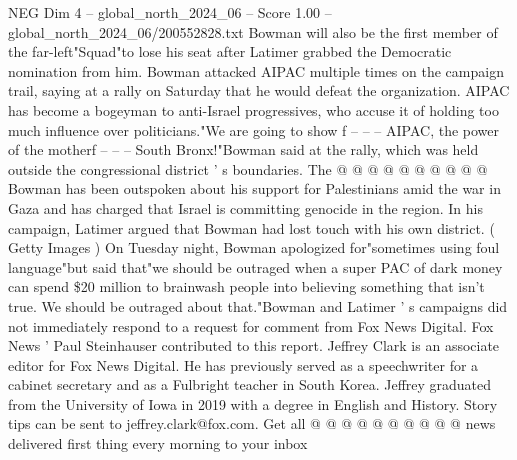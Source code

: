 \begin{textsample}{NEG Dim 4 – global\_north\_2024\_06 – Score 1.00 – global\_north\_2024\_06/200552828.txt}
Bowman will also be the first member of the far-left"Squad"to lose his seat after Latimer grabbed the Democratic nomination from him.
Bowman attacked AIPAC multiple times on the campaign trail, saying at a rally on Saturday that he would defeat the organization.
AIPAC has become a bogeyman to anti-Israel progressives, who accuse it of holding too much influence over politicians."We are going to show f -- -- -- AIPAC, the power of the motherf -- -- -- South Bronx!"Bowman said at the rally, which was held outside the congressional district ' s boundaries.
The @ @ @ @ @ @ @ @ @ @ Bowman has been outspoken about his support for Palestinians amid the war in Gaza and has charged that Israel is committing genocide in the region.
In his campaign, Latimer argued that Bowman had lost touch with his own district. ( Getty Images ) On Tuesday night, Bowman apologized for"sometimes using foul language"but said that"we should be outraged when a super PAC of dark money can spend \$20 million to brainwash people into believing something that isn't true.
We should be outraged about that."Bowman and Latimer ' s campaigns did not immediately respond to a request for comment from Fox News Digital.
Fox News ' Paul Steinhauser contributed to this report.
Jeffrey Clark is an associate editor for Fox News Digital.
He has previously served as a speechwriter for a cabinet secretary and as a Fulbright teacher in South Korea.
Jeffrey graduated from the University of Iowa in 2019 with a degree in English and History.
Story tips can be sent to jeffrey.clark@fox.com.
Get all @ @ @ @ @ @ @ @ @ @ news delivered first thing every morning to your inbox

\end{textsample}
